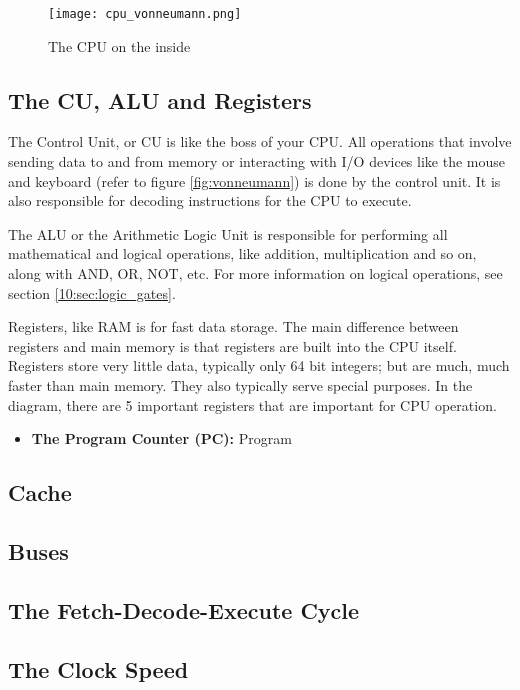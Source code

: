 \documentclass[../main.tex]{subfiles}
\begin{document}
\begin{figure}[H]
    \centering
    \texttt{[image: cpu\_vonneumann.png]}
    \caption{The CPU on the inside}
    \label{fig:cpu_vonneumann}
\end{figure}

\subsection{The CU, ALU and Registers}

The Control Unit, or CU is like the boss of your CPU. All operations that involve sending data to and from memory or interacting with I/O devices like the mouse and keyboard (refer to figure \ref{fig:vonneumann}) is done by the control unit. It is also responsible for decoding instructions for the CPU to execute.

The ALU or the Arithmetic Logic Unit is responsible for performing all mathematical and logical operations, like addition, multiplication and so on, along with AND, OR, NOT, etc. For more information on logical operations, see section \ref{10:sec:logic_gates}.

Registers, like RAM is for fast data storage. The main difference between registers and main memory is that registers are built into the CPU itself. Registers store very little data, typically only 64 bit integers; but are much, much faster than main memory. They also typically serve special purposes. In the diagram, there are 5 important registers that are important for CPU operation.

\begin{itemize}
    \item \textbf{The Program Counter (PC):} Program 
\end{itemize}

\subsection{Cache}

\subsection{Buses}

\subsection{The Fetch-Decode-Execute Cycle}

\subsection{The Clock Speed}
\end{document}
